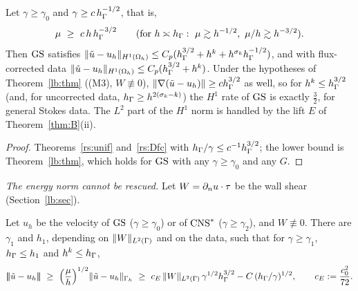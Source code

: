 \begin{corollary}\label{rs:rescue}
Let $\gamma\ge\gamma_0$ and $\gamma\ge c\,h_\Gamma^{-1/2}$, that is,
\[
\mu\ \ge\ c\,h\,h_\Gamma^{-3/2}\qquad(\text{for }h\asymp h_\Gamma:\ \mu\gtrsim h^{-1/2},\ \mu/h\gtrsim h^{-3/2}).
\]
Then $\mathrm{GS}$ satisfies $\lVert \tilde u-u_h\rVert_{H^1(\Omega_h)}\le C_p(h_\Gamma^{3/2}+h^k+h^{\sigma_k}h_\Gamma^{-1/2})$, and with flux-corrected data $\lVert \tilde u-u_h\rVert_{H^1(\Omega_h)}\le C_p(h_\Gamma^{3/2}+h^k)$. Under the hypotheses of Theorem~\ref{lb:thm} ((M3), $W\not\equiv0$), $\lVert \nabla(\tilde u-u_h)\rVert\ge ch_\Gamma^{3/2}$ as well, so for $h^k\le h_\Gamma^{3/2}$ (and, for uncorrected data, $h_\Gamma\ge h^{2(\sigma_k-k)}$) the $H^1$ rate of $\mathrm{GS}$ is exactly $\frac32$, for general Stokes data. The $L^2$ part of the $H^1$ norm is handled by the lift $E$ of Theorem~\ref{thm:B}(ii).
\end{corollary}

\begin{proof}
Theorems~\ref{rs:unif} and~\ref{rs:Dfc} with $h_\Gamma/\gamma\le c^{-1}h_\Gamma^{3/2}$; the lower bound is Theorem~\ref{lb:thm}, which holds for $\mathrm{GS}$ with any $\gamma\ge\gamma_0$ and any $G$.
\end{proof}

\emph{The energy norm cannot be rescued.} Let $W=\partial_n u\cdot\tau$ be the wall shear (Section~\ref{lb:sec}).

\begin{theorem}\label{rs:elower}
Let $u_h$ be the velocity of $\mathrm{GS}$ ($\gamma\ge\gamma_0$) or of $\mathrm{CNS}^\ast$ ($\gamma\ge\gamma_2$), and $W\not\equiv0$. There are $\gamma_1$ and $h_1$, depending on $\lVert W\rVert_{L^2(\Gamma)}$ and on the data, such that for $\gamma\ge\gamma_1$, $h_\Gamma\le h_1$ and $h^k\le h_\Gamma$,
\[
\tnorm{\ut-u_h}\ \ge\ \Bigl(\frac\mu h\Bigr)^{1/2}\norm{\ut-u_h}_{\Gh}\ \ge\ c_E\,\norm{W}_{L^2(\Gamma)}\,\gamma^{1/2}\hG^{3/2}-C\,(\hG/\gamma)^{1/2},\qquad c_E:=\frac{c_0^2}{72}.
\]
\end{theorem}


